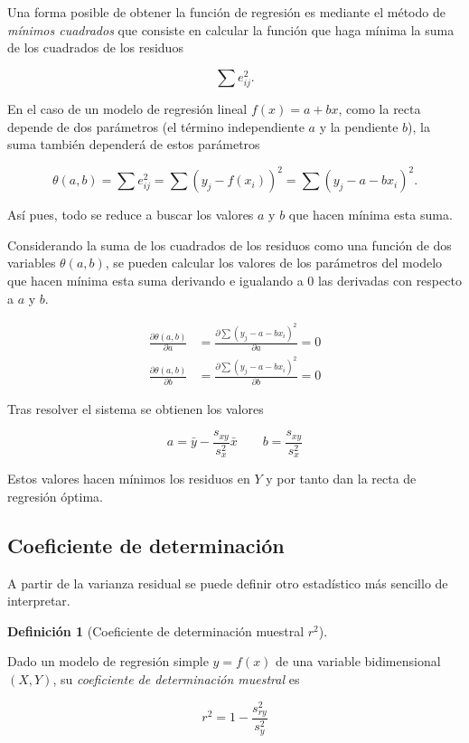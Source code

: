 \documentclass[
  a4paper,
]{scrreport}
\theoremstyle{plain}
\theoremstyle{definition}
\theoremstyle{definition}
\newtheorem{definition}{Definición}[chapter]
\theoremstyle{remark}
\begin{document}
Una forma posible de obtener la función de regresión es mediante el
método de \emph{mínimos cuadrados} que consiste en calcular la función
que haga mínima la suma de los cuadrados de los residuos

\[\sum e_{ij}^2.\]

En el caso de un modelo de regresión lineal \(f(x) = a + bx\), como la
recta depende de dos parámetros (el término independiente \(a\) y la
pendiente \(b\)), la suma también dependerá de estos parámetros

\[\theta(a,b) = \sum e_{ij}^2 =\sum (y_j - f(x_i))^2 =\sum (y_j-a-bx_i)^2.\]

Así pues, todo se reduce a buscar los valores \(a\) y \(b\) que hacen
mínima esta suma.

Considerando la suma de los cuadrados de los residuos como una función
de dos variables \(\theta(a,b)\), se pueden calcular los valores de los
parámetros del modelo que hacen mínima esta suma derivando e igualando a
0 las derivadas con respecto a \(a\) y \(b\).

\begin{align*}
\frac{\partial \theta(a,b)}{\partial a} &=  \frac{\partial \sum (y_j-a-bx_i)^2 }{\partial a} =0\\
\frac{\partial \theta(a,b)}{\partial b} &=  \frac{\partial \sum (y_j-a-bx_i)^2 }{\partial b} =0
\end{align*}

Tras resolver el sistema se obtienen los valores

\[
a= \bar y - \frac{s_{xy}}{s_x^2}\bar x \qquad b=\frac{s_{xy}}{s_x^2}
\]

Estos valores hacen mínimos los residuos en \(Y\) y por tanto dan la
recta de regresión óptima.

\subsection{Coeficiente de
determinación}\label{coeficiente-de-determinaciuxf3n}

A partir de la varianza residual se puede definir otro estadístico más
sencillo de interpretar.

\begin{definition}[Coeficiente de determinación muestral
\(r^2\)]\protect\hypertarget{def-coeficiente-determinacion}{}\label{def-coeficiente-determinacion}

Dado un modelo de regresión simple \(y=f(x)\) de una variable
bidimensional \((X,Y)\), su \emph{coeficiente de determinación muestral}
es

\[r^2 = 1- \frac{s_{ry}^2}{s_y^2}\]

\end{definition}
\end{document}
